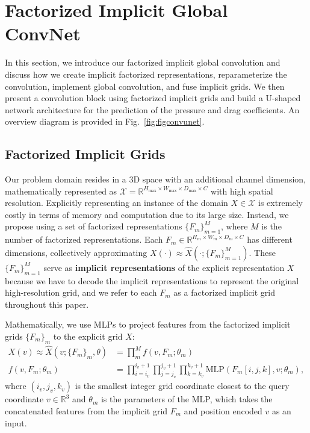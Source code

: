 
\section{Factorized Implicit Global ConvNet}
\label{sec:method}

In this section, we introduce our factorized implicit global convolution and discuss how we create implicit factorized representations, reparameterize the convolution, implement global convolution, and fuse implicit grids. We then present a convolution block using factorized implicit grids and build a U-shaped network architecture for the prediction of the pressure and drag coefficients. An overview diagram is provided in Fig.~\ref{fig:figconvunet}.

\subsection{Factorized Implicit Grids}
\label{sec:factorized_grids}


Our problem domain resides in a 3D space with an additional channel dimension, mathematically represented as $\mathcal{X} = \mathbb{R}^{H_{\max} \times W_{\max} \times D_{\max} \times C}$ with high spatial resolution.
Explicitly representing an instance of the domain $X \in \mathcal{X}$ is extremely costly in terms of memory and computation due to its large size.
Instead, we propose using a set of factorized representations $\{F_m\}_{m=1}^M$, where $M$ is the number of factorized representations. Each $F_m \in \mathbb{R}^{H_m \times W_m \times D_m \times C}$ has different dimensions, collectively approximating $X(\cdot) \approx \hat{X}(\cdot;\{F_m\}_{m=1}^M)$.
These $\{F_m\}_{m=1}^M$ serve as \textbf{implicit representations} of the explicit representation $X$ because we have to decode the implicit representations to represent the original high-resolution grid, and we refer to each $F_m$ as a factorized implicit grid throughout this paper.

Mathematically, we use MLPs to project features from the factorized implicit grids $\{F_m\}_m$ to the explicit grid $X$:
\begin{align}
    X(v) \approx \hat{X}(v;\{F_m\}_m, \theta) & = \prod_m^M f(v, F_m; \theta_m) \\
    f(v, F_m; \theta_m) & = \prod_{i=i_v}^{i_v + 1} \prod_{j=j_v}^{j_v + 1} \prod_{k=k_v}^{k_v + 1} \text{MLP}(F_m[i,j,k], v; \theta_m),
\end{align}
where $(i_v,j_v,k_v)$ is the smallest integer grid coordinate closest to the query coordinate $v \in \mathbb{R}^3$ and $\theta_m$ is the parameters of the MLP, which takes the concatenated features from the implicit grid $F_m$ and position encoded $v$ as an input.

